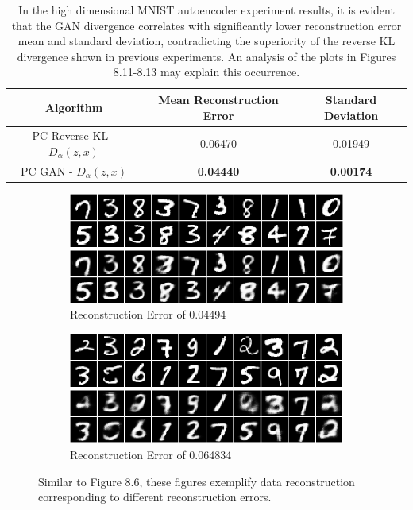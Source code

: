 \documentclass[honours,12pt]{unswthesis}
\numberwithin{equation}{section}
\theoremstyle{definition}
\begin{document}
\begin{table}[h]
\centering
\begin{tabular}{|c|c|c|}
\hline
Algorithm & Mean Reconstruction Error & Standard Deviation\\
\hline
PC Reverse KL - $D_\alpha(z,x)$ & 0.06470 & 0.01949\\
\hline
PC GAN - $D_\alpha(z,x)$ & \textbf{0.04440} & \textbf{0.00174}\\
\hline
\end{tabular}
\caption{\small In the high dimensional MNIST autoencoder experiment results, it is evident that the GAN divergence correlates with significantly lower reconstruction error mean and standard deviation, contradicting the superiority of the reverse KL divergence shown in previous experiments. An analysis of the plots in Figures 8.11-8.13 may explain this occurrence.}
\end{table}
\begin{figure}[h]
\begin{subfigure}{\textwidth}
\centering
\includegraphics[width=0.9\linewidth]{044944.png}
\caption{Reconstruction Error of 0.04494}
\end{subfigure}
\begin{subfigure}{\textwidth}
\centering
\includegraphics[width=0.9\linewidth]{064834.png}
\caption{Reconstruction Error of 0.064834}
\end{subfigure}
\caption{\small Similar to Figure 8.6, these figures exemplify data reconstruction corresponding to different reconstruction errors.}
\end{figure}
\end{document}
